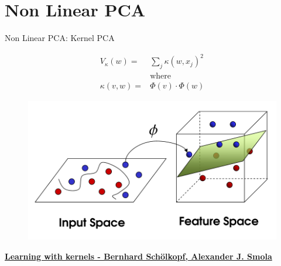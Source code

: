 \documentclass[10pt]{beamer}
\theoremstyle{definition}
\newcommand{\1}{\mathbbm{1}}
\begin{document}
\section{Non Linear PCA}
\begin{frame}{Non Linear PCA: Kernel PCA}
  \begin{minipage}[t]{0.4\textwidth}
    \begin{equation*}
      \begin{aligned}
        V_{\kappa}(w) = &\sum_j \kappa(w, x_j)^2\\
        &\mbox{where} \\
        \kappa(v,w)= & \Phi(v)\cdot\Phi(w)
      \end{aligned}
    \end{equation*}
  \end{minipage}\hfill
  \begin{minipage}[t]{0.4\textwidth}
    \begin{figure}[h!]
      \centering
      \includegraphics[scale=0.15]{./pic/kernel-trick.png}
    \end{figure}
  \end{minipage}\vfill
  \href{https://ieeexplore.ieee.org/servlet/opac?bknumber=6267332}%
  {\bf Learning with kernels - Bernhard Schölkopf, Alexander J. Smola}

\end{frame}
\end{document}

